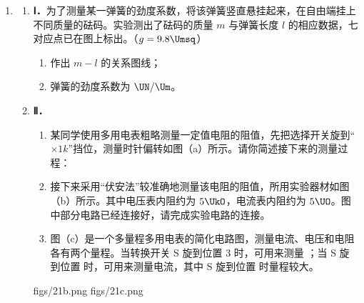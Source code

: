 \documentclass[\gkver]{gaokaozhenti}
\begin{document}
\begin{enumerate}
\item
\begin{enumerate}
	\item
	\textbf{Ⅰ．}为了测量某一弹簧的劲度系数，将该弹簧竖直悬挂起来，在自由端挂上不同质量的砝码。实验测出了砝码的质量 $m$ 与弹簧长度 $l$ 的相应数据，七对应点已在图上标出。（$g=9.8\Umsq$）
	\begin{enumerate}
		\item
		作出 $m-l$ 的关系图线；
		\item
		弹簧的劲度系数为  $\UN/\Um$。
	\end{enumerate}


	\item
	\textbf{Ⅱ．}
	\begin{enumerate}
		\item
		某同学使用多用电表粗略测量一定值电阻的阻值，先把选择开关旋到“$\times1k$”挡位，测量时针偏转如图（a）所示。请你简述接下来的测量过程：
		\item
		接下来采用“伏安法”较准确地测量该电阻的阻值，所用实验器材如图（b）所示。其中电压表内阻约为 $5\UkO$，电流表内阻约为 $5\UO$。图中部分电路已经连接好，请完成实验电路的连接。
		\item
		图（c）是一个多量程多用电表的简化电路图，测量电流、电压和电阻各有两个量程。当转换开关 S 旋到位置 3 时，可用来测量 ；当 S 旋到位置  时，可用来测量电流，其中 S 旋到位置  时量程较大。
	\end{enumerate}

	{figs/21b.png}
	{figs/21c.png}
\end{enumerate}


\end{enumerate}
\end{document}
